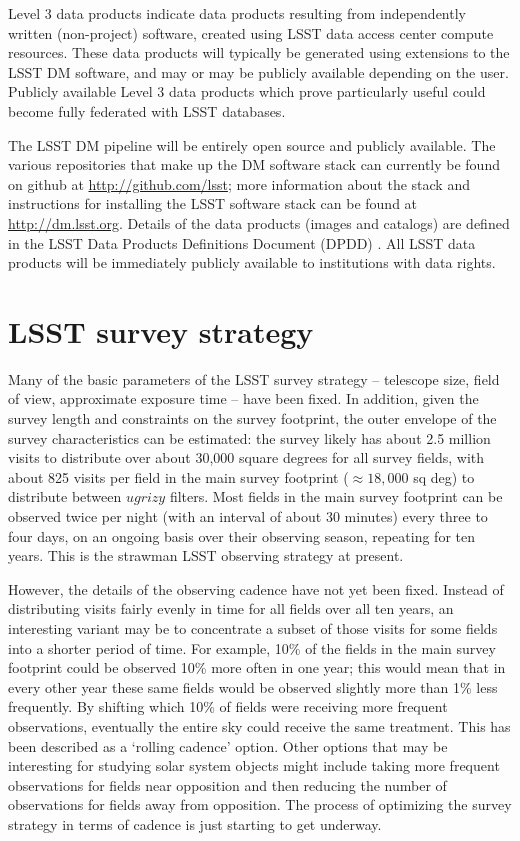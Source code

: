 \documentclass{iau}
\begin{document}
Level 3 data products indicate data products resulting from
independently written (non-project) software, created using LSST data
access center compute resources. These data products will typically be
generated using extensions to the LSST DM software, and may or may be
publicly available depending on the user. Publicly available Level 3
data products which prove particularly useful could become fully
federated with LSST databases.

The LSST DM pipeline will be entirely open source and publicly
available. The various repositories that make up the DM software stack
can currently be found on github at \url{http://github.com/lsst};
more information about the stack and instructions for installing the
LSST software stack can be found at \url{http://dm.lsst.org}. Details
of the data products (images and catalogs) are defined in the LSST
Data Products Definitions Document (DPDD) \cite{LSST_DPDD}. All LSST
data products will be immediately publicly available to institutions
with data rights.

\section{LSST survey strategy}
\label{surveystrategy}

Many of the basic parameters of the LSST survey strategy -- telescope
size, field of view, approximate exposure time -- have been fixed. In
addition, given the survey length and constraints on the survey
footprint, the outer envelope of the survey characteristics can be
estimated: the survey likely has about 2.5 million visits to
distribute over about 30,000 square degrees for all survey fields,
with about 825 visits per field in the main survey footprint
($\approx18,000$ sq deg) to distribute between $ugrizy$ filters. Most
fields in the main survey footprint can be observed twice per night
(with an interval of about 30 minutes) every three to four days, on an
ongoing basis over their observing season, repeating for ten
years. This is the strawman LSST observing strategy at present.

However, the details of the observing cadence have not yet been
fixed. Instead of distributing visits fairly evenly in
time for all fields over all ten years, an interesting variant may be to
concentrate a subset of those visits for some fields into a shorter
period of time. For example, 10\% of the fields in the main survey
footprint could be observed 10\% more often in one year; this would
mean that in every other year these same fields would be observed
slightly more than 1\% less frequently. By shifting which 10\% of fields
were receiving more frequent observations, eventually the entire sky
could receive the same treatment. This has been described as a
`rolling cadence' option. Other options that may be interesting for
studying solar system objects might include taking more frequent
observations for fields near opposition and then reducing the number
of observations for fields away from opposition. The process of
optimizing the survey strategy in terms of cadence is just starting to
get underway.
\end{document}
